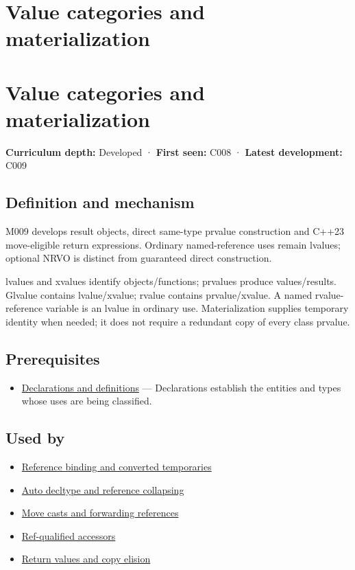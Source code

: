 \hypertarget{appendix-1121b30eaeb0}{}
\section*{Value categories and materialization}
\section{Value categories and materialization}\label{value-categories-and-materialization}

\textbf{Curriculum depth:} Developed · \textbf{First seen:} C008 · \textbf{Latest development:} C009

\subsection{Definition and mechanism}\label{definition-and-mechanism}

M009 develops result objects, direct same-type prvalue construction and C++23 move-eligible return expressions. Ordinary named-reference uses remain lvalues; optional NRVO is distinct from guaranteed direct construction.

lvalues and xvalues identify objects/functions; prvalues produce values/results. Glvalue contains lvalue/xvalue; rvalue contains prvalue/xvalue. A named rvalue-reference variable is an lvalue in ordinary use. Materialization supplies temporary identity when needed; it does not require a redundant copy of every class prvalue.

\subsection{Prerequisites}\label{prerequisites}

\begin{itemize}
\tightlist
\item
  \hyperref[appendix-2e4d494c2d94]{Declarations and definitions} --- Declarations establish the entities and types whose uses are being classified.
\end{itemize}

\subsection{Used by}\label{used-by}

\begin{itemize}
\tightlist
\item
  \hyperref[appendix-37856d997bb0]{Reference binding and converted temporaries}
\item
  \hyperref[appendix-5d4252a42886]{Auto decltype and reference collapsing}
\item
  \hyperref[appendix-0104b704fb11]{Move casts and forwarding references}
\item
  \hyperref[appendix-d42039b1d6f7]{Ref-qualified accessors}
\item
  \hyperref[appendix-b08d3788c5c6]{Return values and copy elision}
\end{itemize}

